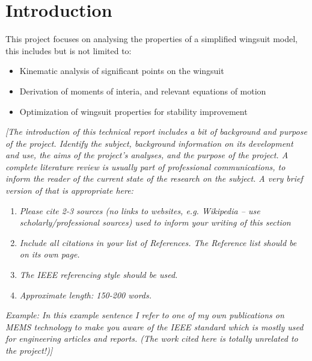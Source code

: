 \documentclass[11pt]{article}
\begin{document}
\section*{Introduction}
This project focuses on analysing the properties of a simplified wingsuit model, this includes but is not limited to:
\begin{itemize}
  \item Kinematic analysis of significant points on the wingsuit
  \item Derivation of moments of interia, and relevant equations of motion
  \item Optimization of wingsuit properties for stability improvement
\end{itemize}
\textcolor[rgb]{0.80,0.29,0.09}{\textsl{[The introduction of this technical report includes a bit of background and purpose of the project. Identify the subject, background information on its development and use, the aims of the project’s analyses, and the purpose of the project. A complete literature review is usually part of professional communications, to inform the reader of the current state of the research on the subject. A very brief version of that is appropriate here:}}
\begin{enumerate}
  \item \textcolor[rgb]{0.80,0.29,0.09}{\textsl{Please cite 2-3 sources (no links to websites, e.g. Wikipedia – use scholarly/professional sources) used to inform your writing of this section}}
  \item \textcolor[rgb]{0.80,0.29,0.09}{\textsl{Include all citations in your list of References. The Reference list should be on its own page.}}
  \item \textcolor[rgb]{0.80,0.29,0.09}{\textsl{The IEEE referencing style should be used.}}
  \item \textcolor[rgb]{0.80,0.29,0.09}{\textsl{Approximate length: 150-200 words.}}
\end{enumerate}
\textcolor[rgb]{0.80,0.29,0.09}{\textsl{Example: In this example sentence I refer to one of my own publications on MEMS technology \cite{gutschmidt2024} to make you aware of the IEEE standard \cite{IEEE} which is mostly used for engineering articles and reports. (The work cited here is totally unrelated to the project!)]}}

\end{document}
